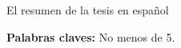 \chapter*{\runtitulo}

\noindent El resumen de la tesis en español

\bigskip

\noindent\textbf{Palabras claves:} No menos de 5.